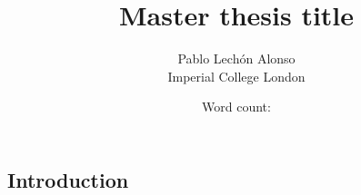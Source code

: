 \documentclass[titlepage,11pt]{article}
\newcommand{\wordcount}{} %
\begin{document}
	
	\title{\textbf{Master thesis title} }
	\author{Pablo Lechón Alonso \\ [30pt]
		Imperial College London}
	\date{Word count: \wordcount}%
	\maketitle
	
	
	\begin{abstract}
	
	\end{abstract}
	
	\tableofcontents
	\newpage
	
	\begin{linenumbers}
		\section{Introduction}
			
	\end{linenumbers}
		
		\newpage
		
		
	
\end{document}
